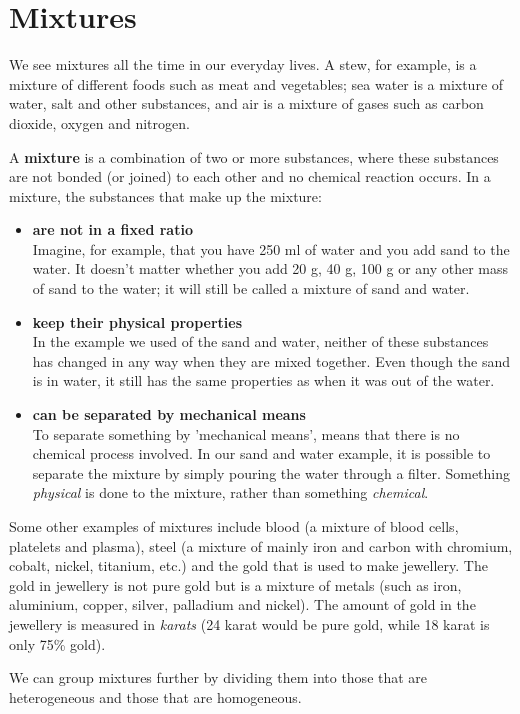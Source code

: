             \section{Mixtures}
            \nopagebreak
            \label{m38708*id62584}We see mixtures all the time in our everyday lives. A stew, for example, is a mixture of different foods such as meat and vegetables; sea water is a mixture of water, salt and other substances, and air is a mixture of gases such as carbon dioxide, oxygen and nitrogen.\par 
\label{m38708*fhsst!!!underscore!!!id69}
 {\label{m38708*meaningfhsst!!!underscore!!!id69}
      A \textbf{mixture} is a combination of two or more substances, where these substances are not bonded (or joined) to each other and no chemical reaction occurs. 
       } 
      \label{m38708*id62612}In a mixture, the substances that make up the mixture:\par 
      \label{m38708*id62615}\begin{itemize}[noitemsep]
            \label{m38708*uid2}\item \textbf{are not in a fixed ratio} \\
Imagine, for example, that you have 250 ml of water and you add sand to the water. It doesn't matter whether you add 20 g, 40 g, 100 g or any other mass of sand to the water; it will still be called a mixture of sand and water.
\label{m38708*uid3}\item \textbf{keep their physical properties} \\
In the example we used of the sand and water, neither of these substances has changed in any way when they are mixed together. Even though the sand is in water, it still has the same properties as when it was out of the water.
\label{m38708*uid4}\item \textbf{can be separated by mechanical means} \\
To separate something by 'mechanical means', means that there is no chemical process involved. In our sand and water example, it is possible to separate the mixture by simply pouring the water through a filter. Something \textsl{physical} is done to the mixture, rather than something \textsl{chemical}.
\end{itemize}
      \label{m38708*id62689}Some other examples of mixtures include blood (a mixture of blood cells, platelets and plasma), steel (a mixture of mainly iron and carbon with chromium, cobalt, nickel, titanium, etc.) and the gold that is used to make jewellery. The gold in jewellery is not pure gold but is a mixture of metals (such as iron, aluminium, copper, silver, palladium and nickel). The amount of gold in the jewellery is measured in \textsl{karats} (24 karat would be pure gold, while 18 karat is only 75\% gold).\par 
      \label{m38708*id62700}We can group mixtures further by dividing them into those that are heterogeneous and those that are homogeneous.\par 

